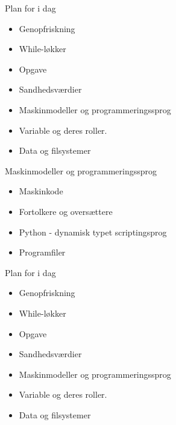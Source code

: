 \documentclass[a4paper,landscape]{slides}
\begin{document}
\begin{slide}
	\begin{center} {\large 
            Plan for i dag
	} \end{center}
	\begin{itemize} \addtolength{\itemsep}{-\baselineskip}
    		\item Genopfriskning
    		\item While-løkker
    		\item Opgave
    		\item Sandhedsværdier
    		\item Maskinmodeller og programmeringssprog
    		\item Variable og deres roller.
    		\item Data og filsystemer
	\end{itemize}
\end{slide}


\begin{slide}
	\begin{center} {\large 
            Maskinmodeller og programmeringssprog
	} \end{center}
	\begin{itemize} \addtolength{\itemsep}{-\baselineskip}
    		\item Maskinkode
                \item Fortolkere og oversættere
                \item Python - dynamisk typet scriptingsprog
                \item Programfiler
	\end{itemize}
\end{slide}

\begin{slide}
	\begin{center} {\large 
            Plan for i dag
	} \end{center}
	\begin{itemize} \addtolength{\itemsep}{-\baselineskip}
    		\item Genopfriskning
    		\item While-løkker
    		\item Opgave
    		\item Sandhedsværdier
    		\item Maskinmodeller og programmeringssprog
    		\item Variable og deres roller.
    		\item Data og filsystemer
	\end{itemize}
\end{slide}
\end{document}
